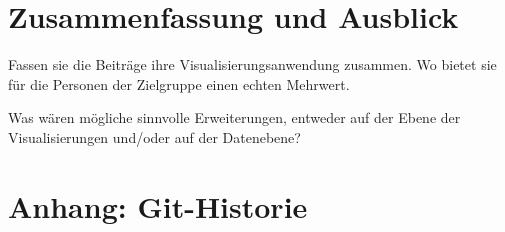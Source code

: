 \documentclass[usegeometry=true]{scrartcl}
\begin{document}
\section{Zusammenfassung und Ausblick}
Fassen sie die Beiträge ihre Visualisierungsanwendung zusammen. Wo bietet sie für die Personen der Zielgruppe einen echten Mehrwert.

Was wären mögliche sinnvolle Erweiterungen, entweder auf der Ebene der Visualisierungen und/oder auf der Datenebene?

\section*{Anhang: Git-Historie}

\printbibliography
\end{document}

